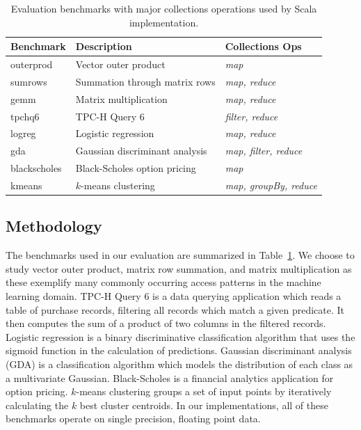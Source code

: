 \begin{table}
\centering\footnotesize
\hspace{-0.022\textwidth}\begin{tabular}{lll}
\toprule

{\bf Benchmark} & {\bf Description} & {\bf Collections Ops}\\ \midrule
outerprod & Vector outer product & \emph{map}\\ \midrule
sumrows & Summation through matrix rows & \emph{map, reduce}\\ \midrule
gemm & Matrix multiplication & \emph{map, reduce}\\ \midrule
tpchq6 & TPC-H Query 6 & \emph{filter, reduce}\\ \midrule
logreg & Logistic regression & \emph{map, reduce}\\ \midrule
gda & Gaussian discriminant analysis & \emph{map, filter, reduce}\\ \midrule
blackscholes & Black-Scholes option pricing & \emph{map}\\ \midrule
kmeans & $k$-means clustering & \emph{map, groupBy, reduce}\\ \bottomrule
\end{tabular}

\caption{Evaluation benchmarks with major collections operations used by
Scala implementation.}
\label{table:benchmarks}
\end{table}

\subsection{Methodology}
The benchmarks used in our evaluation are summarized in Table~\ref{table:benchmarks}.
We choose to study vector outer product, matrix row summation, and matrix multiplication as these exemplify many commonly occurring access patterns in the machine learning domain.
TPC-H Query 6 is a data querying application which reads a table of purchase records, filtering all
records which match a given predicate. It then computes the sum of a product of two columns in the filtered records.
Logistic regression is a binary discriminative classification algorithm that uses the sigmoid function in the calculation of predictions.
Gaussian discriminant analysis (GDA) is a classification algorithm which models the distribution of each class as a multivariate Gaussian.
Black-Scholes is a financial analytics application for option pricing.
$k$-means clustering groups a set of input points by iteratively calculating the $k$ best cluster centroids.
In our implementations, all of these benchmarks operate on single precision, floating point data.

